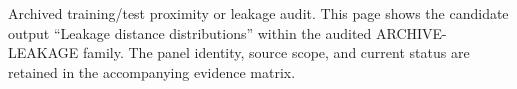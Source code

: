 Archived training/test proximity or leakage audit. This page shows the candidate output ``Leakage distance distributions'' within the audited ARCHIVE-LEAKAGE family. The panel identity, source scope, and current status are retained in the accompanying evidence matrix.
